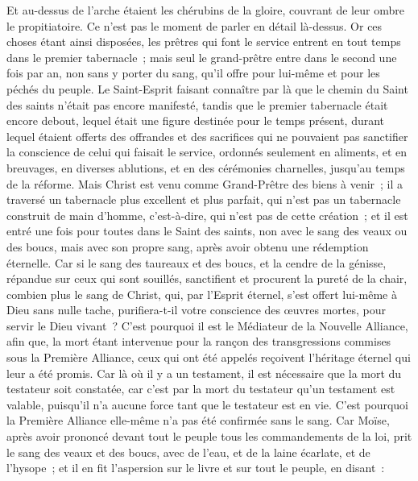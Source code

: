 \begin{multicols}{2}
Et au-dessus de l'arche étaient les chérubins de la gloire, couvrant de leur ombre le propitiatoire. Ce n'est pas le moment de parler en détail là-dessus.
Or ces choses étant ainsi disposées, les prêtres qui font le service entrent en tout temps dans le premier tabernacle~;
mais seul le grand-prêtre entre dans le second une fois par an, non sans y porter du sang, qu'il offre pour lui-même et pour les péchés du peuple.
Le Saint-Esprit faisant connaître par là que le chemin du Saint des saints n'était pas encore manifesté, tandis que le premier tabernacle était encore debout,
lequel était une figure destinée pour le temps présent, durant lequel étaient offerts des offrandes et des sacrifices qui ne pouvaient pas sanctifier la conscience de celui qui faisait le service,
ordonnés seulement en aliments, et en breuvages, en diverses ablutions, et en des cérémonies charnelles, jusqu'au temps de la réforme.
Mais Christ est venu comme Grand-Prêtre des biens à venir~; il a traversé un tabernacle plus excellent et plus parfait, qui n'est pas un tabernacle construit de main d'homme, c'est-à-dire, qui n'est pas de cette création~;
et il est entré une fois pour toutes dans le Saint des saints, non avec le sang des veaux ou des boucs, mais avec son propre sang, après avoir obtenu une rédemption éternelle.
Car si le sang des taureaux et des boucs, et la cendre de la génisse, répandue sur ceux qui sont souillés, sanctifient et procurent la pureté de la chair,
combien plus le sang de Christ, qui, par l'Esprit éternel, s'est offert lui-même à Dieu sans nulle tache, purifiera-t-il votre conscience des œuvres mortes, pour servir le Dieu vivant~?
C'est pourquoi il est le Médiateur de la Nouvelle Alliance, afin que, la mort étant intervenue pour la rançon des transgressions commises sous la Première Alliance, ceux qui ont été appelés reçoivent l'héritage éternel qui leur a été promis.
Car là où il y a un testament, il est nécessaire que la mort du testateur soit constatée,
car c'est par la mort du testateur qu'un testament est valable, puisqu'il n'a aucune force tant que le testateur est en vie.
C'est pourquoi la Première Alliance elle-même n'a pas été confirmée sans le sang.
Car Moïse, après avoir prononcé devant tout le peuple tous les commandements de la loi, prit le sang des veaux et des boucs, avec de l'eau, et de la laine écarlate, et de l'hysope~; et il en fit l'aspersion sur le livre et sur tout le peuple, en disant~:

\end{multicols}
